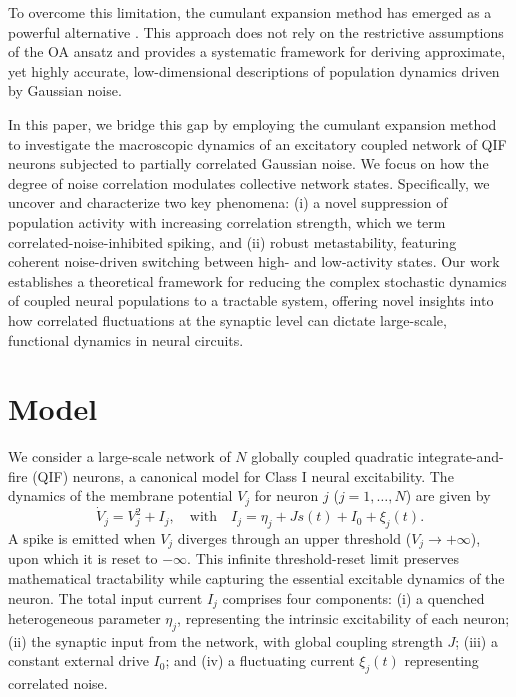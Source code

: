 \documentclass[aps,twocolumn,pre]{revtex4-2}
\begin{document}
To overcome this limitation, the cumulant expansion method has emerged as a powerful alternative \cite{tyulkina2018dynamics,goldobin2021reduction}. This approach does not rely on the restrictive assumptions of the OA ansatz and provides a systematic framework for deriving approximate, yet highly accurate, low-dimensional descriptions of population dynamics driven by Gaussian noise.

In this paper, we bridge this gap by employing the cumulant expansion method to investigate the macroscopic dynamics of an excitatory coupled network of QIF neurons subjected to partially correlated Gaussian noise. We focus on how the degree of noise correlation modulates collective network states. Specifically, we uncover and characterize two key phenomena: (i) a novel suppression of population activity with increasing correlation strength, which we term correlated-noise-inhibited spiking, and (ii) robust metastability, featuring coherent noise-driven switching between high- and low-activity states. Our work establishes a theoretical framework for reducing the complex stochastic dynamics of coupled neural populations to a tractable system, offering novel insights into how correlated fluctuations at the synaptic level can dictate large-scale, functional dynamics in neural circuits.

\section{Model}
We consider a large-scale network of $N$ globally coupled quadratic integrate-and-fire (QIF) neurons, a canonical model for Class I neural excitability. The dynamics of the membrane potential $V_j$ for neuron $j$ ($j=1,\ldots,N$) are given by
\begin{equation}
\dot{V}_j = V_j^2 + I_j, \quad \text{with} \quad I_j = \eta_j + J s(t) + I_0 + \xi_j(t).
\label{Eq:Model_V}
\end{equation}
A spike is emitted when $V_j$ diverges through an upper threshold ($V_j \to +\infty$), upon which it is reset to $-\infty$. This infinite threshold-reset limit preserves mathematical tractability while capturing the essential excitable dynamics of the neuron. The total input current $I_j$ comprises four components: (i) a quenched heterogeneous parameter $\eta_j$, representing the intrinsic excitability of each neuron; (ii) the synaptic input from the network, with global coupling strength $J$; (iii) a constant external drive $I_0$; and (iv) a fluctuating current $\xi_j(t)$ representing correlated noise.
\end{document}
